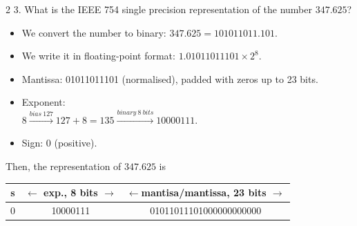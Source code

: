 \begin{paracol}{2}
3. What is the IEEE 754 single precision representation of the number $347.625$?
\begin{itemize}[leftmargin=\dimexpr 26pt-.25in]
	\item We convert the number to binary: $347.625 = 101011011.101$.
	\item We write it in floating-point format: $1.01011011101\times 2^{8}$.
	\item Mantissa: 01011011101 (normalised), padded with zeros up to 23 bits.
	\item Exponent:\\ $8 \xrightarrow{bias\ 127} 127+8=135  \xrightarrow{binary \ 8 \ bits} 10000111$.
	\item Sign: 0 (positive).
\end{itemize}
Then, the representation of $347.625$ is
\end{paracol}
\begin{center}
\begin{tabular}{|c||c||c|}
\hline
s&$\leftarrow$ exp., 8 bits $\rightarrow$&$\leftarrow$mantisa/mantissa, 23 bits $\rightarrow$\\
\hline
0&10000111&01011011101000000000000\\
\hline
\end{tabular}
\end{center}

